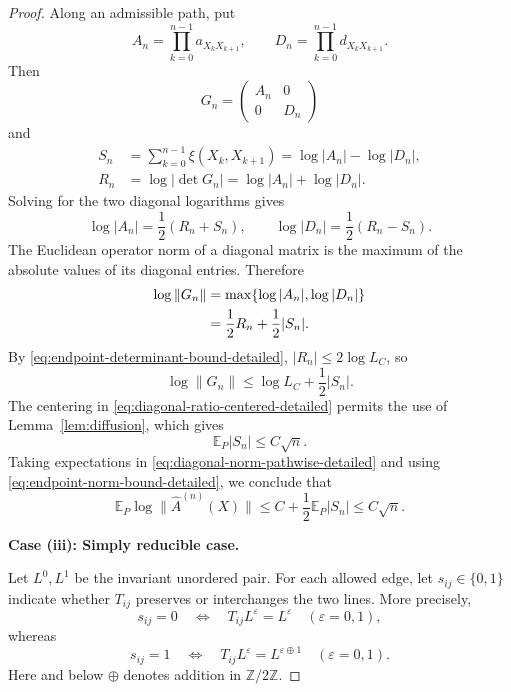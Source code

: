 \documentclass[11pt,a4paper]{amsart}
\theoremstyle{definition}
\theoremstyle{remark}
\numberwithin{equation}{section}
\newcommand{\EE}{\mathbb E}
\newcommand{\1}{\boldsymbol 1}
\begin{document}
\begin{proof}
Along an admissible path, put
$$
 A_n=\prod_{k=0}^{n-1}a_{X_kX_{k+1}},
 \qquad
 D_n=\prod_{k=0}^{n-1}d_{X_kX_{k+1}}.
$$
Then
$$
 G_n=\begin{pmatrix}A_n&0\\0&D_n\end{pmatrix}
$$
and
\begin{align*}
 S_n
 &=\sum_{k=0}^{n-1}\xi(X_k,X_{k+1})
  =\log|A_n| -\log|D_n|,\\
 R_n
 &=\log|\det G_n|
  =\log|A_n|+\log|D_n|.
\end{align*}
Solving for the two diagonal logarithms gives
$$
 \log|A_n|=\frac12(R_n+S_n),
 \qquad
 \log|D_n|=\frac12(R_n-S_n).
$$
The Euclidean operator norm of a diagonal matrix is the maximum of the
absolute values of its diagonal entries.  Therefore
\begin{align}
 \log\|G_n\|
 &=\max\{\log|A_n|,\log|D_n|\}\notag\\
 &=\frac12R_n+\frac12|S_n|.
 \label{eq:diagonal-norm-exact}
\end{align}
By \eqref{eq:endpoint-determinant-bound-detailed},
$|R_n|\le2\log L_C$, so
\begin{equation}\label{eq:diagonal-norm-pathwise-detailed}
 \log\|G_n\|\le\log L_C+\frac12|S_n|.
\end{equation}
The centering in \eqref{eq:diagonal-ratio-centered-detailed} permits
the use of Lemma~\ref{lem:diffusion}, which gives
$$
 \EE_P|S_n|\le C\sqrt n.
$$
Taking expectations in
\eqref{eq:diagonal-norm-pathwise-detailed} and using
\eqref{eq:endpoint-norm-bound-detailed}, we conclude that
$$
 \EE_P\log\|\widehat A^{(n)}(X)\|
 \le C+\frac12\EE_P|S_n|
 \le C\sqrt n.
$$

\medskip
\noindent
\textbf{Case (iii): Simply reducible case.}

Let $L^0,L^1$ be the invariant unordered pair.  For each allowed
edge, let $s_{ij}\in\{0,1\}$ indicate whether $T_{ij}$ preserves
or interchanges the two lines.  More precisely,
$$
 s_{ij}=0
 \quad\Longleftrightarrow\quad
 T_{ij}L^\varepsilon=L^\varepsilon
 \quad(\varepsilon=0,1),
$$
whereas
$$
 s_{ij}=1
 \quad\Longleftrightarrow\quad
 T_{ij}L^\varepsilon=L^{\varepsilon\oplus1}
 \quad(\varepsilon=0,1).
$$
Here and below $\oplus$ denotes addition in
$\mathbb Z/2\mathbb Z$.


\end{proof}
\end{document}

